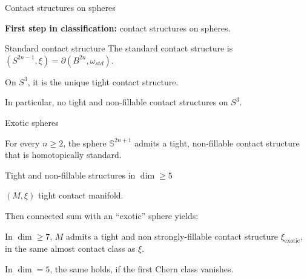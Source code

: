 \documentclass{beamer}
\begin{document}
\begin{frame}{Contact structures on spheres}

\textbf{First step in classification:} contact structures on spheres.

\begin{exampleblock}{Standard contact structure}
The standard contact structure is $(S^{2n-1},\xi)=\partial(B^{2n},\omega_{std})$.
\end{exampleblock}

\pause

\begin{theorem}[Eliashberg, '91] 
    On $S^3$, it is the unique tight contact structure.
\end{theorem} 

In particular, no tight and non-fillable contact structures on $S^3$.

    
    
    
    


\end{frame}

\begin{frame}{Exotic spheres}
    
    \begin{theorem}
        For every $n \geq 2$, the sphere $\mathbb S^{2n+1}$ admits a tight, non-fillable contact structure that is homotopically standard.
    \end{theorem}
        
\end{frame}

\begin{frame}{Tight and non-fillable structures in $\dim \geq 5$}

$(M, \xi)$ tight contact manifold. 

\pause 

Then connected sum with an ``exotic'' sphere yields:

\begin{theorem}
In $\dim \geq 7$, $M$ admits a tight and non strongly-fillable contact structure $\xi_\text{exotic}$, in the same almost contact class as $\xi$. 
\pause

\smallskip

In $\dim=5$, the same holds, if the first Chern class vanishes.
\end{theorem}

    
\end{frame}
\end{document}
